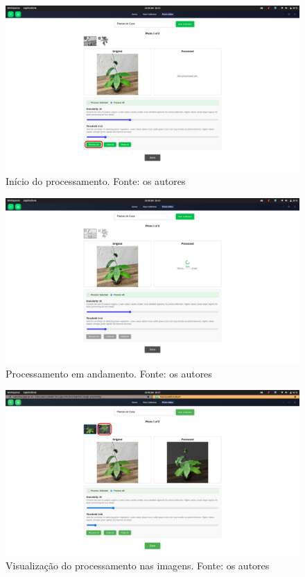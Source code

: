 \begin{figure}[H]
    \centering
    \includegraphics[width=1\textwidth]{../figures/screens/uc012/Screenshot from 2025-06-28 16-45-39.png}
    \caption{Início do processamento. Fonte: os autores}
    \label{fig:uc012-screen5}
\end{figure}

\begin{figure}[H]
    \centering
    \includegraphics[width=1\textwidth]{../figures/screens/uc012/Screenshot from 2025-06-28 16-45-48.png}
    \caption{Processamento em andamento. Fonte: os autores}
    \label{fig:uc012-screen6}
\end{figure}

\begin{figure}[H]
    \centering
    \includegraphics[width=1\textwidth]{../figures/screens/uc012/Screenshot from 2025-06-28 16-57-59.png}
    \caption{Visualização do processamento nas imagens. Fonte: os autores}
    \label{fig:uc012-screen7}
\end{figure}

